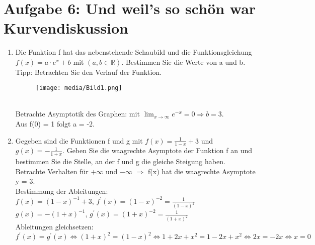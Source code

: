 \documentclass[11pt,a4paper, parskip=half ]{report}
\begin{document}
\section*{Aufgabe 6: Und weil's so schön war Kurvendiskussion}
\begin{enumerate}
  \item Die Funktion f  hat das nebenstehende Schaubild und die	Funktionsgleichung $f(x) = a\cdot e^x + b$ mit $(a,b \in \mathbb{R})$. Bestimmen Sie die Werte von a und b. Tipp: Betrachten Sie den Verlauf der Funktion.
  \begin{figure}
    \texttt{[image: media/Bild1.png]}
  \end{figure}
  \vspace{20pt}
  \\Betrachte Asymptotik des Graphen: mit $\lim_{x\rightarrow\infty} e^{-x} = 0 \Rightarrow b = 3$.
  \\Aus f(0) = 1 folgt a = -2.	
  \item Gegeben sind die Funktionen f und g mit $f(x) = \frac{1}{1-x}+3$ und $g(x)=-\frac{1}{1+x}$.	Geben Sie die waagrechte Asymptote der Funktion f an und bestimmen Sie die Stelle, an der f und g  die gleiche Steigung haben.
  \vspace{20pt}
  \\Betrachte Verhalten für $+\infty$ und $-\infty$ $\Rightarrow$ f(x) hat die waagrechte Asymptote y = 3.
  \\Bestimmung der Ableitungen:	
  \\$f(x) = (1-x)^{-1}+3$, $f^{\prime}(x) = (1-x)^{-2} = \frac{1}{(1-x)^2}$ 
  \\$g(x) = -(1+x)^{-1}$, $g^{\prime}(x) = (1+x)^{-2} = \frac{1}{(1+x)^2}$      
  \\Ableitungen gleichsetzen:
  \\$f^{\prime}(x) = g^{\prime}(x)   \Leftrightarrow 	(1+x)^2 = (1-x)^2 \Leftrightarrow 1+2x+x^2 = 1-2x+x^2 \Leftrightarrow 2x = -2x \Leftrightarrow x = 0$	

\end{enumerate}
 
\end{document}
